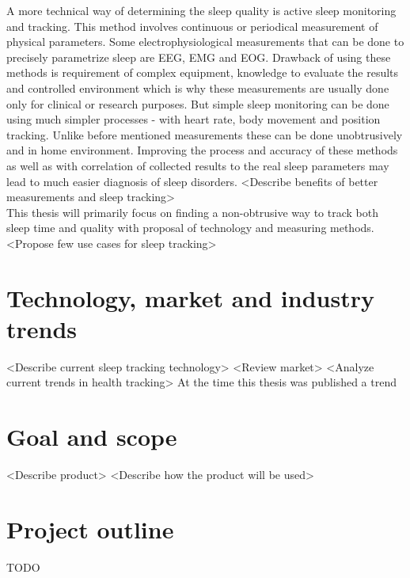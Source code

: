A more technical way of determining the sleep quality is active sleep monitoring and tracking. This method involves continuous or periodical measurement of physical parameters. Some electrophysiological measurements that can be done to precisely parametrize sleep are \ac{EEG}, \ac{EMG} and \ac{EOG}. Drawback of using these methods is requirement of complex equipment, knowledge to evaluate the results and controlled environment which is why these measurements are usually done only for clinical or research purposes. But simple sleep monitoring can be done using much simpler processes - with heart rate, body movement and position tracking. Unlike before mentioned measurements these can be done unobtrusively and in home environment. Improving the process and accuracy of these methods as well as with correlation of collected results to the real sleep parameters may lead to much easier diagnosis of sleep disorders. <Describe benefits of better measurements and sleep tracking>\\

This thesis will primarily focus on finding a non-obtrusive way to track both sleep time and quality with proposal of technology and measuring methods.\\

<Propose few use cases for sleep tracking>

\section{Technology, market and industry trends}
<Describe current sleep tracking technology>
<Review market>
<Analyze current trends in health tracking>
At the time this thesis was published a trend

\section{Goal and scope}
<Describe product>
<Describe how the product will be used>

\section{Project outline}
TODO